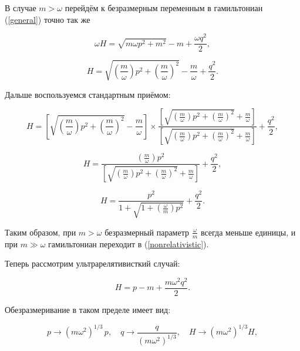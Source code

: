 \documentclass[12pt,a4paper,oneside]{article}
\begin{document}
В случае $m > \omega$ перейдём к безразмерным переменным в гамильтониан (\ref{general}) точно так же

\begin{equation}
\omega H = \sqrt{m\omega p^2 + m^2} - m + \dfrac{\omega q^2}{2},
\end{equation}

\begin{equation}
H = \sqrt{\left(\frac{m}{\omega}\right) p^2 + \left(\frac{m}{\omega}\right)^2} -  \dfrac{m}{\omega} + \dfrac{q^2}{2}.
\end{equation}

Дальше воспользуемся стандартным приёмом:

\begin{equation}
H = \left[ \sqrt{\left(\frac{m}{\omega}\right) p^2 + \left(\frac{m}{\omega}\right)^2} -  \dfrac{m}{\omega} \right] \times \dfrac{ \left[ \sqrt{\left(\frac{m}{\omega}\right) p^2 + \left(\frac{m}{\omega}\right)^2} +  \frac{m}{\omega} \right]}{ \left[ \sqrt{\left(\frac{m}{\omega}\right) p^2 + \left(\frac{m}{\omega}\right)^2} +  \frac{m}{\omega} \right]} + \dfrac{q^2}{2},
\end{equation}

\begin{equation}
H =  \dfrac{ \left(\frac{m}{\omega}\right) p^2 }{ \left[ \sqrt{\left(\frac{m}{\omega}\right) p^2 + \left(\frac{m}{\omega}\right)^2} +  \frac{m}{\omega} \right]} + \dfrac{q^2}{2},
\end{equation}

\begin{equation}\label{largemass}
H =  \dfrac{ p^2 }{ 1 + \sqrt{1 + \left(\frac{\omega}{m}\right) p^2}} + \dfrac{q^2}{2}.
\end{equation}

Таким образом, при $m > \omega$ безразмерный параметр $\frac{\omega}{m}$ всегда меньше единицы, и при $m \gg \omega$ гамильтониан переходит в (\ref{nonrelativistic}). 

Теперь рассмотрим ультрарелятивисткий случай:

\begin{equation}
H = p - m + \dfrac{m\omega^2 q^2}{2}.
\end{equation}

Обезразмеривание в таком пределе имеет вид:

\begin{equation}
p \to (m\omega^2)^{1/3}\, p, \quad q \to \frac{q}{(m\omega^2)^{1/3}}, \quad H \to (m\omega^2)^{1/3}  H,
\end{equation}
\end{document}
